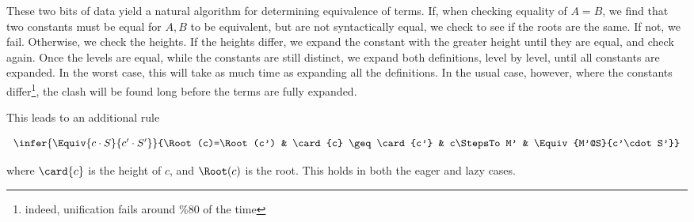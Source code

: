 These two bits of data yield a natural algorithm for determining 
equivalence of terms.  If, when checking equality of $A=B$,
we find that two constants must be equal for $A,B$ to
be equivalent, but are not syntactically equal, 
we check to see if the roots are the same.
If not, we fail.  Otherwise, we check the heights.  If the heights
differ, we expand the constant with the greater height until 
they are equal, and check again.  Once the levels
are equal, while the constants are still distinct, we 
expand both definitions, level by level, until all constants
are expanded.  In the worst case, this will take as much time
as expanding all the definitions.  In the usual case, however,
where the constants differ\footnote{indeed, unification fails
around \%80 of the time}, the clash will be found long before
the terms are fully expanded.  

This leads to an additional rule 

$$
\begin{array}{cccc}
\infer{\Equiv{c\cdot S}{c'\cdot S'}}{\Root(c)=\Root(c') & \card{c} \geq \card{c'} & c\StepsTo M' & \Equiv{M'@S}{c'\cdot S'}} 
\end{array} 
$$

where $\card{c}$ is the height of $c$, and $\Root(c)$ is the root.
This holds in both the eager and lazy cases.
